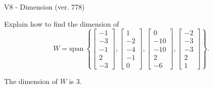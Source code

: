 \begin{exercise}
  \begin{exerciseTitle}V8 - Dimension (ver. 778)\end{exerciseTitle}
  \begin{exerciseStatement}
    Explain how to find the dimension of 
\[W=\mathrm{span}\ \left\{\left[\begin{array}{r}
-1 \\
-3 \\
-1 \\
2 \\
-3
\end{array}\right] , \left[\begin{array}{r}
1 \\
-2 \\
-4 \\
-1 \\
0
\end{array}\right] , \left[\begin{array}{r}
0 \\
-10 \\
-10 \\
2 \\
-6
\end{array}\right] , \left[\begin{array}{r}
-2 \\
-3 \\
-3 \\
2 \\
1
\end{array}\right]\right\}.\]



  \end{exerciseStatement}
  \begin{exerciseAnswer}
   The dimension of \(W\) is  \(3\).
  


  \end{exerciseAnswer}
\end{exercise}